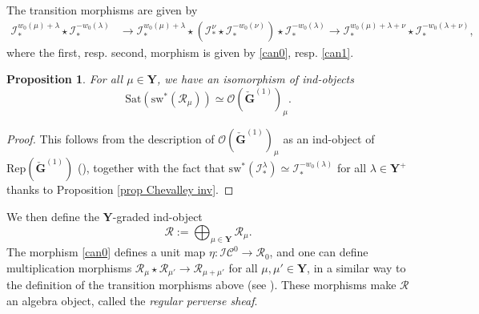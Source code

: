 \documentclass[11pt]{amsart}
\theoremstyle{plain}
\newtheorem{prop}[thm]{Proposition}
\theoremstyle{remark}
\numberwithin{equation}{section}
\begin{document}
	The transition morphisms are given by
	\begin{align*}
		\mathcal{I}^{w_0(\mu)+\lambda}_*\star\mathcal{I}^{-w_0(\lambda)}_*&\to \mathcal{I}^{w_0(\mu)+\lambda}_*\star(\mathcal{I}^\nu_*\star \mathcal{I}^{-w_0(\nu)}_*) \star\mathcal{I}^{-w_0(\lambda)}_*\to \mathcal{I}^{w_0(\mu)+\lambda+\nu}_*\star\mathcal{I}^{-w_0(\lambda+\nu)}_*,
	\end{align*}
	where the first, resp. second, morphism is given by \eqref{can0}, resp. \eqref{can1}. 
	\begin{prop}\label{Proposition regular perverse sheaf}
		For all $\mu\in\mathbf{Y}$, we have an isomorphism of ind-objects
		$$ \mathrm{Sat}(\mathrm{sw}^*(\mathcal{R}_\mu))\simeq  \mathcal{O}(\check{\mathbf{G}}^{(1)})_\mu.$$
	\end{prop}
	\begin{proof}
		This follows from the description of $\mathcal{O}(\check{\mathbf{G}}^{(1)})_\mu$ as an ind-object of $\mathrm{Rep}(\check{\mathbf{G}}^{(1)})$ (\cite[Lemma 4.2]{achar2022geometric}), together with the fact that $\mathrm{sw}^*(\mathcal{I}^{\lambda}_*)\simeq\mathcal{I}^{-w_0(\lambda)}_* $ for all $\lambda\in\mathbf{Y}^+$ thanks to Proposition \ref{prop Chevalley inv}.
	\end{proof}
	We then define the $\mathbf{Y}$-graded ind-object
	$$\mathcal{R}:=\bigoplus_{\mu\in\mathbf{Y}} \mathcal{R}_\mu.$$
	The morphism \eqref{can0} defines a unit map $\eta:\mathcal{IC}^0\to \mathcal{R}_0$, and one can define multiplication morphisms $\mathcal{R}_\mu\star\mathcal{R}_{\mu'}\to \mathcal{R}_{\mu+\mu'}$ for all $\mu,\mu'\in\mathbf{Y}$, in a similar way to the definition of the transition morphisms above (see \cite[(5.5)]{achar2022geometric}). These morphisms make $\mathcal{R}$ an algebra object, called the \textit{regular perverse sheaf}.
	
\end{document}
